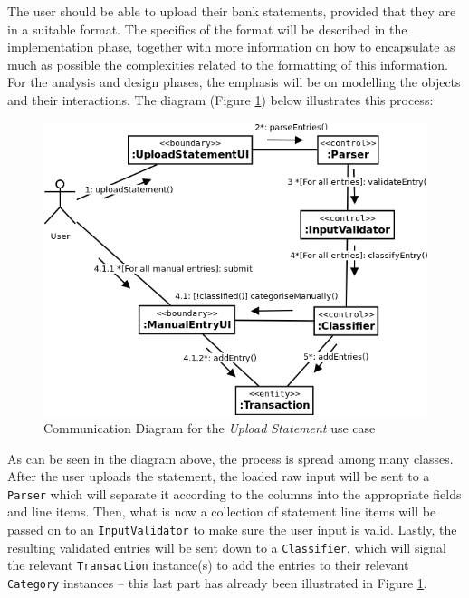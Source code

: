 The user should be able to upload their bank statements, provided that they are
in a suitable format. The specifics of the format will be described in the
implementation phase, together with more information on how to encapsulate as
much as possible the complexities related to the formatting of this
information.  For the analysis and design phases, the emphasis will be on
modelling the objects and their interactions. The diagram (Figure
\ref{fig:CommDiagram.CreateManualEntry}) below illustrates this process:
\begin{figure}[ht!]
  \begin{center}
    \includegraphics[width=16cm]{./contents/img/Comm_Diagram_-_Upload_Statement.png}
  \end{center}
  \caption{Communication Diagram for the \emph{Upload Statement} use case}
  \label{fig:CommDiagram.CreateManualEntry}
\end{figure}
\FloatBarrier

As can be seen in the diagram above, the process is spread among many classes.
After the user uploads the statement, the loaded raw input will be sent to a
\texttt{Parser} which will separate it according to the columns into the
appropriate fields and line items. Then, what is now a collection of statement
line items will be passed on to an \texttt{InputValidator} to make sure the user
input is valid. Lastly, the resulting validated entries will be sent down to a
\texttt{Classifier}, which will signal the relevant \texttt{Transaction}
instance(s) to add the entries to their relevant \texttt{Category} instances --
this last part has already been illustrated in Figure
\ref{fig:CommDiagram.CreateManualEntry}. 

